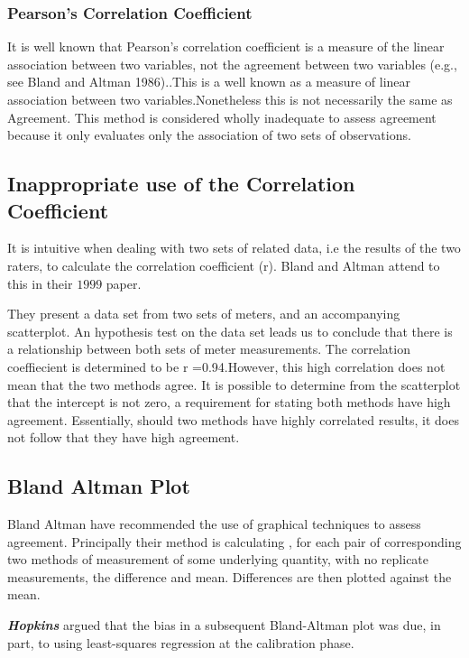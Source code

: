 \documentclass[Chap1main.tex]{subfiles}
\begin{document}
\subsubsection{Pearson's Correlation Coefficient} It is well known that
Pearson's correlation coefficient is a measure of the linear
 association between two variables, not the agreement between two
 variables (e.g., see Bland and Altman 1986)..This is a well known
as a measure of linear association between two
variables.Nonetheless this is not necessarily the same as
Agreement. This method is considered wholly inadequate to assess
agreement because it only evaluates only the association of two
sets of observations.

\subsection{Inappropriate use of the Correlation Coefficient}
It is intuitive when dealing with two sets of related data, i.e
the results of the two raters,  to calculate the correlation
coefficient (r). Bland and Altman attend to this in their $1999$
paper.

They present a data set from two sets of meters, and an
accompanying scatterplot. An hypothesis test on the data set leads
us to conclude that there is a relationship between both sets of
meter measurements. The correlation coeffiecient is determined to
be r =0.94.However, this high correlation does not mean that the
two methods agree. It is possible to determine from the
scatterplot that the intercept is not zero, a requirement for
stating both methods have high agreement. Essentially, should two
methods have highly correlated results, it does not follow that
they have high agreement.

\subsection{Bland Altman Plot}
Bland Altman have recommended the use of graphical techniques to
assess agreement. Principally their method is calculating , for
each pair of corresponding two methods of measurement of some
underlying quantity, with no replicate measurements, the
difference and mean. Differences are then plotted against the
mean.

\textbf{\textit{Hopkins}} argued that the bias in a subsequent Bland-Altman plot was
due, in part, to using least-squares regression at the calibration
phase.
\end{document}
